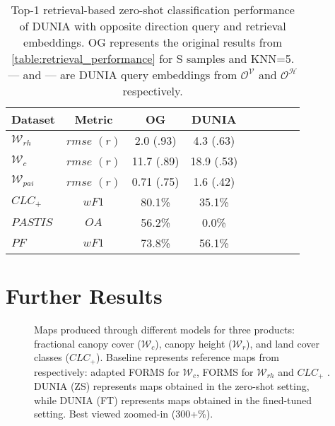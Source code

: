 \begin{table}[H]
\caption{Top-1 retrieval-based zero-shot classification performance of DUNIA with opposite direction query and retrieval embeddings. OG represents the original results from \cref{table:retrieval_performance} for S samples and KNN=5. \colorbox{cgreen!50}{\textcolor{cgreen!50}{---}} and \colorbox{cblue!50}{\textcolor{cblue!50}{---}} are DUNIA query embeddings from $\mathcal{O^V}$ and $\mathcal{O^H}$ respectively.}
\label{table:reversed_embeddings}
\begin{center}
\begin{small}
\begin{sc}

\begin{tabular}{lcccccccc}
\toprule
Dataset & Metric & OG & DUNIA                                  \\
\midrule                         
\cellcolor{cblue!50}$\mathcal{W}_{rh}$                 &$rmse$ $(r)$             &2.0 (.93)   &4.3 (.63) \\
\cellcolor{cblue!50}$\mathcal{W}_c$                    &$rmse$ $(r)$            &11.7 (.89)  &18.9 (.53) \\
\cellcolor{cblue!50}$\mathcal{W}_{pai}$                &$rmse$ $(r)$            & 0.71 (.75) &1.6 (.42) \\
\cellcolor{cgreen!50}$CLC_+$                  &$wF1$           &80.1\%        &35.1\%\\
\cellcolor{cgreen!50}$PASTIS$                 &$OA$    &56.2\%  &0.0\%\\
\cellcolor{cgreen!50}$PF$                     &$wF1$            &73.8\%        &56.1\% \\
\bottomrule
\end{tabular}
\end{sc}
\end{small}
\end{center}
\end{table} 


\clearpage
\section{Further Results}
\begin{figure*}[!ht]
\begin{center}
\end{center}
\caption{Maps produced through different models for three products: fractional canopy cover ($\mathcal{W}_{c}$), canopy height ($\mathcal{W}_{r}$), and land cover classes ($CLC_+$). Baseline represents reference maps from respectively: adapted FORMS \cite{schwartz2023forms} for $\mathcal{W}_c$, FORMS \cite{schwartz2023forms} for $\mathcal{W}_{rh}$ and $CLC_+$ \cite{clc}. DUNIA (ZS) represents maps obtained in the zero-shot setting, while DUNIA (FT) represents maps obtained in the fined-tuned setting. Best viewed zoomed-in (300+\%).}
\label{fig:result_maps}
\end{figure*}

